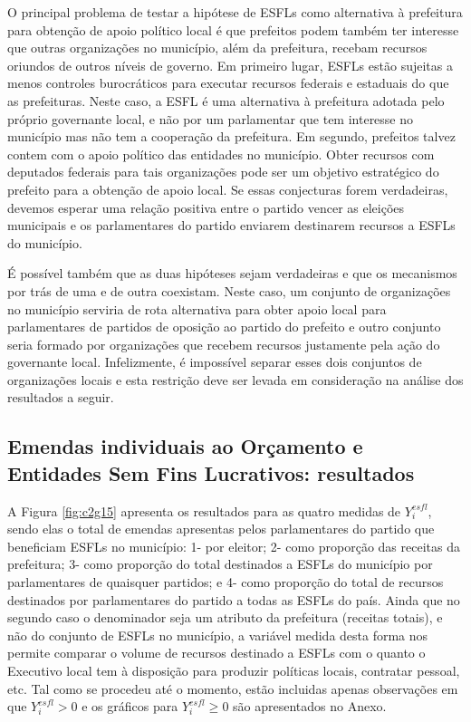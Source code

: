 O principal problema de testar a hipótese de ESFLs como alternativa à prefeitura para obtenção de apoio político local é que prefeitos podem também ter interesse que outras organizações no município, além da prefeitura, recebam recursos oriundos de outros níveis de governo. Em primeiro lugar, ESFLs estão sujeitas a menos controles burocráticos para executar recursos federais e estaduais do que as prefeituras. Neste caso, a ESFL é uma alternativa à prefeitura adotada pelo próprio governante local, e não por um parlamentar que tem interesse no município mas não tem a cooperação da prefeitura. Em segundo, prefeitos talvez contem com o apoio político das entidades no município. Obter recursos com deputados federais para tais organizações pode ser um objetivo estratégico do prefeito para a obtenção de apoio local. Se essas conjecturas forem verdadeiras, devemos esperar uma relação positiva entre o partido vencer as eleições municipais e os parlamentares do partido enviarem destinarem recursos a ESFLs do município.

É possível também que as duas hipóteses sejam verdadeiras e que os mecanismos por trás de uma e de outra coexistam. Neste caso, um conjunto de organizações no município serviria de rota alternativa para obter apoio local para parlamentares de partidos de oposição ao partido do prefeito e outro conjunto seria formado por organizações que recebem recursos justamente pela ação do governante local. Infelizmente, é impossível separar esses dois conjuntos de organizações locais e esta restrição deve ser levada em consideração na análise dos resultados a seguir.

\subsection{Emendas individuais ao Orçamento e Entidades Sem Fins Lucrativos: resultados}

A Figura \ref{fig:c2g15} apresenta os resultados para as quatro medidas de $Y_{i}^{esfl}$, sendo elas o total de emendas apresentas pelos parlamentares do partido que beneficiam ESFLs no município: 1- por eleitor; 2- como proporção das receitas da prefeitura; 3- como proporção do total destinados a ESFLs do município por parlamentares de quaisquer partidos; e 4- como proporção do total de recursos destinados por parlamentares do partido a todas as ESFLs do país. Ainda que no segundo caso o denominador seja um atributo da prefeitura (receitas totais), e não do conjunto de ESFLs no município, a variável medida desta forma nos permite comparar o volume de recursos destinado a ESFLs com o quanto o Executivo local tem à disposição para produzir políticas locais, contratar pessoal, etc. Tal como se procedeu até o momento, estão incluidas apenas observações em que $Y_{i}^{esfl}>0$ e os gráficos para $Y_{i}^{esfl} \geq 0$ são apresentados no Anexo.

